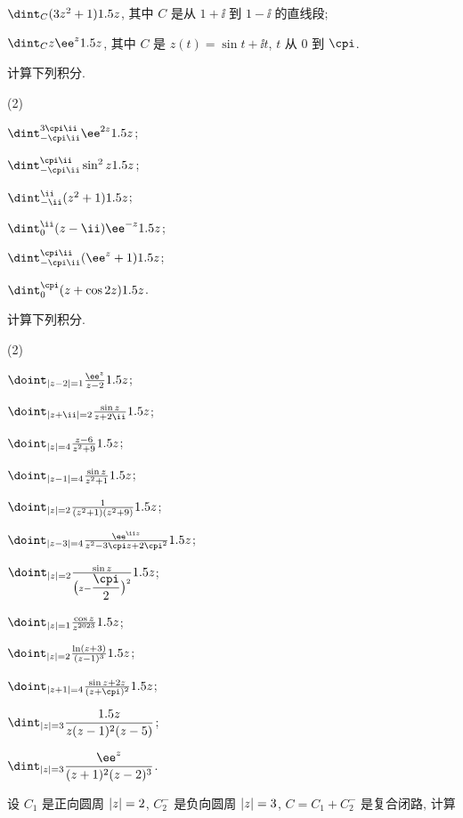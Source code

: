 \begin{homework}
\begin{homework}
\begin{subhomework}
      \item $\dint_C (3z^2+1) \d z$, 其中 $C$ 是从 $1+\ii$ 到 $1-\ii$ 的直线段;
      \item $\dint_C z\ee^z \d z$, 其中 $C$ 是 $z(t)=\sin t+\ii t$, $t$ 从 $0$ 到 $\cpi$.
    \end{subhomework}
    \item 计算下列积分.
    \begin{subhomework}(2)
      \item $\dint_{-\cpi\ii}^{3\cpi\ii}\ee^{2z}\d z$;
      \item $\dint_{-\cpi\ii}^{\cpi\ii}\sin^2z\d z$;
      \item $\dint_{-\ii}^{\ii}(z^2+1)\d z$;
      \item $\dint_0^\ii (z-\ii)\ee^{-z}\d z$;
      \item $\dint_{-\cpi\ii}^{\cpi\ii}(\ee^z+1)\d z$;
      \item $\dint_0^\cpi (z+\cos 2z)\d z$.
    \end{subhomework}
    \item 计算下列积分.
    \begin{subhomework}(2)
      \item $\doint_{\abs{z-2}=1}\frac{\ee^z}{z-2}\d z$;
      \item $\doint_{\abs{z+\ii}=2}\frac{\sin z}{z+2\ii}\d z$;
      \item $\doint_{\abs{z}=4}\frac{z-6}{z^2+9}\d z$;
      \item $\doint_{\abs{z-1}=4}\frac{\sin z}{z^2+1}\d z$;
      \item $\doint_{\abs{z}=2}\frac1{(z^2+1)(z^2+9)}\d z$;
      \item $\doint_{\abs{z-3}=4}\frac{\ee^{\ii z}}{z^2-3\cpi z+2\cpi^2}\d z$;
      \item $\doint_{\abs{z}=2}\frac{\sin z}{\bigl(z-\dfrac\cpi 2\bigr)^2}\d z$;
      \item $\doint_{\abs{z}=1}\frac{\cos z}{z^{2023}}\d z$;
      \item $\doint_{\abs{z}=2}\frac{\ln(z+3)}{(z-1)^3}\d z$;
      \item $\doint_{\abs{z+1}=4}\frac{\sin z+2z}{(z+\cpi)^2}\d z$;
      \item $\dint_{\abs{z}=3}\dfrac{\d z}{z(z-1)^2(z-5)}$;
      \item $\dint_{\abs{z}=3}\dfrac{\ee^z}{(z+1)^2(z-2)^3}$.
    \end{subhomework}
    \item 设 $C_1$ 是正向圆周 $\left|z\right|=2$, $C_2^-$ 是负向圆周 $\left|z\right|=3$, $C=C_1+C_2^-$ 是复合闭路, 计算 

\end{homework}
\end{homework}
